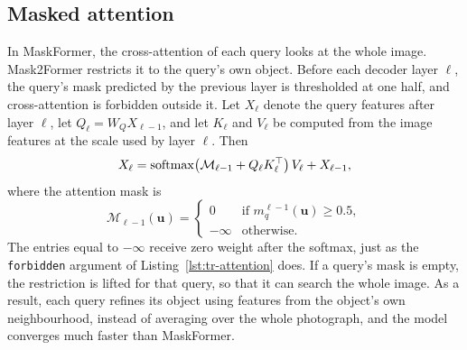 \subsection{Masked attention}\label{sec:tr-masked}
In MaskFormer, the cross-attention of each query looks at the whole image. Mask2Former restricts it to
the query's own object. Before each decoder layer $\ell$, the query's mask predicted by the previous
layer is thresholded at one half, and cross-attention is forbidden outside it. Let $X_\ell$ denote the
query features after layer $\ell$, let $Q_\ell = W_Q X_{\ell-1}$, and let $K_\ell$ and $V_\ell$ be
computed from the image features at the scale used by layer $\ell$. Then
\begin{equation}
X_\ell = \operatorname{softmax}\!\big(\mathcal{M}_{\ell-1} + Q_\ell K_\ell^{\top}\big)\,V_\ell + X_{\ell-1},
\label{eq:tr-masked}
\end{equation}
where the attention mask is
\begin{equation*}
\mathcal{M}_{\ell-1}(\mathbf{u}) =
\begin{cases} 0 & \text{if } m_q^{\ell-1}(\mathbf{u}) \ge 0.5,\\ -\infty & \text{otherwise.}\end{cases}
\end{equation*}
The entries equal to $-\infty$ receive zero weight after the softmax, just as the \texttt{forbidden}
argument of Listing~\ref{lst:tr-attention} does. If a query's mask is empty, the restriction is lifted
for that query, so that it can search the whole image. As a result, each query refines its object using
features from the object's own neighbourhood, instead of averaging over the whole photograph, and the
model converges much faster than MaskFormer.

